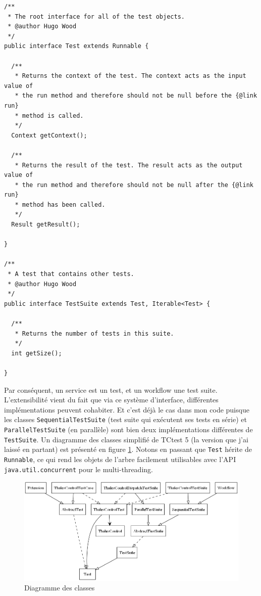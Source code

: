 \begin{verbatim}
/**
 * The root interface for all of the test objects.
 * @author Hugo Wood
 */
public interface Test extends Runnable {
  
  /**
   * Returns the context of the test. The context acts as the input value of 
   * the run method and therefore should not be null before the {@link run} 
   * method is called.
   */
  Context getContext();

  /**
   * Returns the result of the test. The result acts as the output value of 
   * the run method and therefore should not be null after the {@link run} 
   * method has been called.
   */
  Result getResult();
   
}

/**
 * A test that contains other tests.
 * @author Hugo Wood
 */
public interface TestSuite extends Test, Iterable<Test> {
  
  /**
   * Returns the number of tests in this suite.
   */
  int getSize();

}
\end{verbatim}

Par conséquent, un service est un test, et un workflow une test suite. 
L'extensibilité vient du fait que via ce système d'interface, différentes 
implémentations peuvent cohabiter. Et c'est déjà le cas dans mon code puisque 
les classes \verb|SequentialTestSuite| (test suite qui exécutent ses tests en 
série) et \verb|ParallelTestSuite| (en parallèle) sont bien deux implémentations
différentes de \verb|TestSuite|. Un diagramme des classes simplifié de TCtest 5 
(la version que j'ai laissé en partant) est présenté en figure \ref{Classes}.
Notons en passant que \verb|Test| hérite de \verb|Runnable|, ce qui rend les 
objets de l'arbre facilement utilisables avec l'API \verb|java.util.concurrent| 
pour le multi-threading.

\begin{figure}[htb]
	\centering
	\includegraphics[scale=0.4]{classes.png}
	\caption{Diagramme des classes}
	\label{Classes}
\end{figure}

